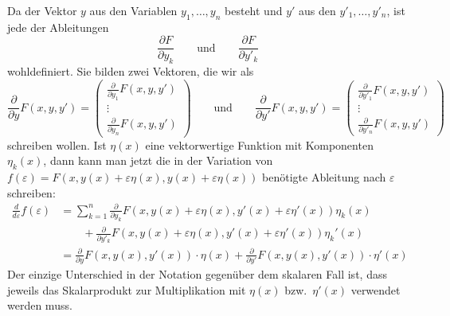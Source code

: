 Da der Vektor $y$ aus den Variablen $y_1,\dots,y_n$ besteht und $y'$
aus den $y'_1,\dots,y'_n$, ist jede der Ableitungen
\[
\frac{\partial F}{\partial y_k}
\qquad\text{und}\qquad
\frac{\partial F}{\partial y'_k}
\]
wohldefiniert.
Sie bilden zwei Vektoren, die wir als
\begin{equation}
\frac{\partial}{\partial y}
F(x,y,y')
=
\begin{pmatrix}
\frac{\partial}{\partial y_1}F(x,y,y')\\
\vdots\\
\frac{\partial}{\partial y_n}F(x,y,y')
\end{pmatrix}
\qquad\text{und}\qquad
\frac{\partial}{\partial y'} F(x,y,y')
=
\begin{pmatrix}
\frac{\partial}{\partial y'_1}F(x,y,y')\\
\vdots\\
\frac{\partial}{\partial y'_n}F(x,y,y')
\end{pmatrix}
\end{equation}
schreiben wollen.
Ist $\eta(x)$ eine vektorwertige Funktion mit Komponenten
$\eta_k(x)$, dann kann man jetzt 
die in der Variation von
$f(\varepsilon) = F(x,y(x)+\varepsilon\eta(x),y(x)+\varepsilon\eta(x))$
benötigte Ableitung nach $\varepsilon$ schreiben:
\begin{align*}
\frac{d}{d\varepsilon}f(\varepsilon)
&=
\sum_{k=1}^n
\frac{\partial}{\partial y_k}
F(x,y(x)+\varepsilon\eta(x),y'(x)+\varepsilon\eta'(x))
\eta_k(x)
\\
&\qquad
+
\frac{\partial}{\partial y'_k}
F(x,y(x)+\varepsilon\eta(x),y'(x)+\varepsilon\eta'(x))
\eta_k'(x)
\\
&=
\frac{\partial}{\partial y}
F(x,y(x),y'(x))\cdot \eta(x)
+
\frac{\partial}{\partial y'}
F(x,y(x),y'(x))\cdot \eta'(x)
\end{align*}
Der einzige Unterschied in der Notation gegenüber dem skalaren Fall
ist, dass jeweils das Skalarprodukt zur Multiplikation mit $\eta(x)$
bzw.~$\eta'(x)$ verwendet werden muss.

%
%
